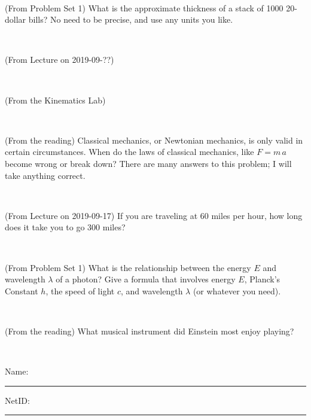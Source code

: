 \documentclass[12pt, letterpaper]{article}
\begin{document}
\vfill ~

\begin{problem} (From Problem Set 1)
What is the approximate thickness of a stack of 1000 20-dollar bills?
No need to be precise, and use any units you like.
\end{problem}


\vfill ~

\begin{problem} (From Lecture on 2019-09-??)
\end{problem}


\vfill ~

\begin{problem} (From the Kinematics Lab)

\end{problem}


\vfill ~


\clearpage


\begin{problem} (From the reading)
Classical mechanics, or Newtonian mechanics, is only valid in certain
circumstances. When do the laws of classical mechanics, like $F =
m\,a$ become wrong or break down? There are many answers to this
problem; I will take anything correct.
\end{problem}


\vfill ~

\begin{problem} (From Lecture on 2019-09-17)
If you are traveling at 60 miles per hour, how long does
it take you to go 300 miles?
\end{problem}


\vfill ~

\begin{problem} (From Problem Set 1)
What is the relationship between the energy $E$ and wavelength
$\lambda$ of a photon? Give a formula that involves energy $E$,
Planck's Constant $h$, the speed of light $c$, and wavelength
$\lambda$ (or whatever you need).
\end{problem}

\vfill ~

\begin{problem} (From the reading)
What musical instrument did Einstein most enjoy playing?
\end{problem}


\vfill ~


\cleardoublepage



\noindent
Name: \rule[-1ex]{0.60\textwidth}{0.1pt}
NetID: \rule[-1ex]{0.20\textwidth}{0.1pt}
\end{document}
